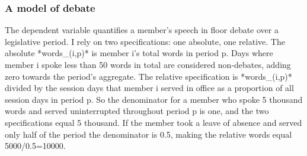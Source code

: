\documentclass[letter,12pt]{article}
\begin{document}








    \subsubsection{A model of debate}
  
The dependent variable quantifies a member's speech in floor debate over a legislative period. I rely on two specifications: one absolute, one relative. The absolute *words_(i,p)* is member i's total words in period p. Days where member i spoke less than 50 words in total are considered non-debates, adding zero towards the period's aggregate. The relative specification is *words_(i,p)* divided by the session days that member i served in office as a proportion of all session days in period p. So the denominator for a member who spoke 5 thousand words and served uninterrupted throughout period p is one, and the two specifications equal 5 thousand. If the member took a leave of absence and served only half of the period the denominator is 0.5, making the relative words equal 5000/0.5=10000.  
\end{document}

